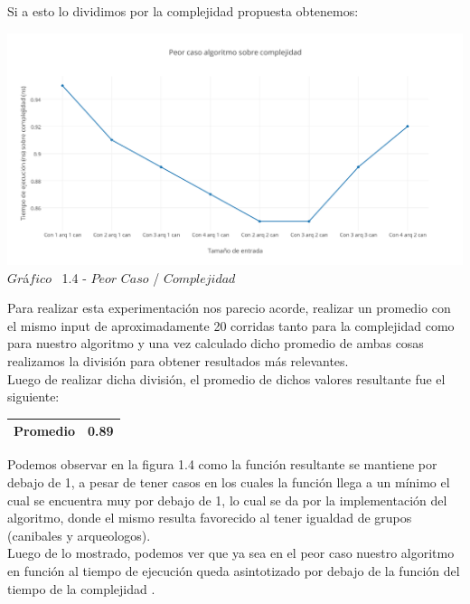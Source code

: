 Si a esto lo dividimos por la complejidad propuesta obtenemos:\\

\vspace*{0.3cm} \vspace*{0.3cm}
  \begin{center}
 \includegraphics[scale=0.65]{./EJ1/peorcasoej11.png}
 {$Gr$\'a$fico$ \ 1.4 - $Peor$ $Caso$ / $Complejidad$}
  \end{center}
   \vspace*{0.3cm}
  
  Para realizar esta experimentaci\'on nos parecio acorde, realizar un promedio con el mismo input de aproximadamente 20 corridas tanto para la complejidad como para nuestro algoritmo y una vez calculado dicho promedio de ambas cosas realizamos la divisi\'on para obtener resultados m\'as relevantes.\\ 

Luego de realizar dicha divisi\'on, el promedio de dichos valores resultante fue el siguiente:

\begin{center}
\begin{table}[H]
    \begin{tabular}{ | l |l |}
    \hline
	
    \textbf{Promedio} &  0.89 \\ \hline

    \end{tabular}
\end{table}
\end{center}

Podemos observar en la figura 1.4 como la funci\'on resultante se mantiene por debajo de 1, a pesar de tener casos en los cuales la funci\'on llega a un m\'inimo el cual se encuentra muy por debajo de 1, lo cual se da por la implementaci\'on del algoritmo, donde el mismo resulta favorecido al tener igualdad de grupos (canibales y arqueologos).\\

Luego de lo mostrado, podemos ver que ya sea en el peor caso nuestro algoritmo en funci\'on al tiempo de ejecuci\'on queda asintotizado por debajo de la funci\'on del tiempo de la complejidad .